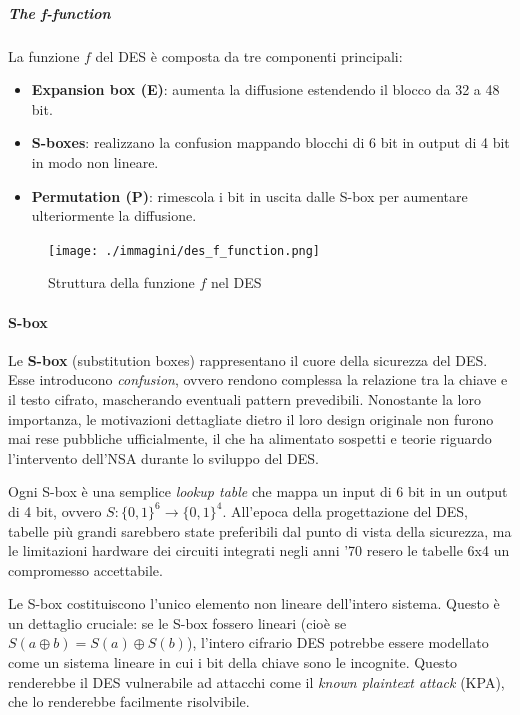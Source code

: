 \documentclass{report}
\begin{document}
\subparagraph{The f-function}

La funzione $f$ del DES è composta da tre componenti principali:
\begin{itemize}
    \item \textbf{Expansion box (E)}: aumenta la diffusione estendendo il blocco da 32 a 48 bit.
    \item \textbf{S-boxes}: realizzano la confusion mappando blocchi di 6 bit in output di 4 bit in modo non lineare.
    \item \textbf{Permutation (P)}: rimescola i bit in uscita dalle S-box per aumentare ulteriormente la diffusione.
\end{itemize}

\begin{figure}[h]
\centering
\texttt{[image: ./immagini/des\_f\_function.png]}
\caption{Struttura della funzione $f$ nel DES}
\end{figure}

\paragraph{S-box}

Le \textbf{S-box} (substitution boxes) rappresentano il cuore della sicurezza del DES. Esse introducono \textit{confusion}, ovvero rendono complessa la relazione tra la chiave e il testo cifrato, mascherando eventuali pattern prevedibili. Nonostante la loro importanza, le motivazioni dettagliate dietro il loro design originale non furono mai rese pubbliche ufficialmente, il che ha alimentato sospetti e teorie riguardo l'intervento dell’NSA durante lo sviluppo del DES.

Ogni S-box è una semplice \textit{lookup table} che mappa un input di 6 bit in un output di 4 bit, ovvero $S : \{0,1\}^6 \rightarrow \{0,1\}^4$. All’epoca della progettazione del DES, tabelle più grandi sarebbero state preferibili dal punto di vista della sicurezza, ma le limitazioni hardware dei circuiti integrati negli anni ’70 resero le tabelle 6x4 un compromesso accettabile.

Le S-box costituiscono l’unico elemento non lineare dell’intero sistema. Questo è un dettaglio cruciale: se le S-box fossero lineari (cioè se $S(a \oplus b) = S(a) \oplus S(b)$), l’intero cifrario DES potrebbe essere modellato come un sistema lineare in cui i bit della chiave sono le incognite. Questo renderebbe il DES vulnerabile ad attacchi come il \textit{known plaintext attack} (KPA), che lo renderebbe facilmente risolvibile.
\end{document}
